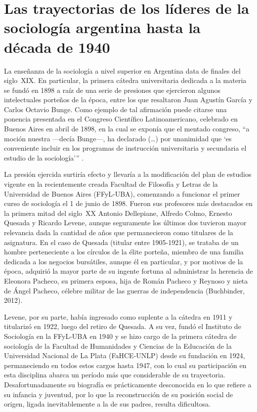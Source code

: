 \section{Las trayectorias de los líderes de la sociología argentina hasta la década de 1940}

La enseñanza de la sociología a nivel superior en Argentina data de finales del siglo~XIX. En particular, la primera cátedra universitaria dedicada a la materia se fundó en 1898 a raíz de una serie de presiones que ejercieron algunos intelectuales porteños de la época, entre los que resaltaron Juan Agustín García y Carlos Octavio Bunge. Como ejemplo de tal afirmación puede citarse una ponencia presentada en el Congreso Científico Latinoamericano, celebrado en Buenos Aires en abril de 1898, en la cual se exponía que el mentado congreso, \enquote{a moción nuestra ---decía Bunge---, ha declarado (\dots) por unanimidad que \enquote{es conveniente incluir en los programas de instrucción universitaria y secundaria el estudio de la sociología}} \parencite[80]{1445-BUNGE1898}.

La presión ejercida surtiría efecto y llevaría a la modificación del plan de estudios vigente en la recientemente creada Facultad de Filosofía y Letras de la Universidad de Buenos Aires (FFyL-UBA), comenzando a funcionar el primer curso de sociología el 1 de junio de 1898. Fueron sus profesores más destacados en la primera mitad del siglo~XX Antonio Dellepiane, Alfredo Colmo, Ernesto Quesada y Ricardo Levene, aunque seguramente los últimos dos tuvieron mayor relevancia dada la cantidad de años que permanecieron como titulares de la asignatura. En el caso de Quesada (titular entre 1905-1921), se trataba de un hombre perteneciente a los círculos de la élite porteña, miembro de una familia dedicada a los negocios bursátiles, aunque él en particular, y por motivos de la época, adquirió la mayor parte de su ingente fortuna al administrar la herencia de Eleonora Pacheco, su primera esposa, hija de Román Pacheco y Reynoso y nieta de Ángel Pacheco, célebre militar de las guerras de independencia (Buchbinder, 2012).

Levene, por su parte, había ingresado como suplente a la cátedra en 1911 y titularizó en 1922, luego del retiro de Quesada. A su vez, fundó el Instituto de Sociología en la FFyL-UBA en 1940 y se hizo cargo de la primera cátedra de sociología de la Facultad de Humanidades y Ciencias de la Educación de la Universidad Nacional de La Plata (FaHCE-UNLP) desde su fundación en 1924, permaneciendo en todos estos cargos hasta 1947, con lo cual su participación en esta disciplina abarca un período más que considerable de su trayectoria. Desafortunadamente su biografía es prácticamente desconocida en lo que refiere a su infancia y juventud, por lo que la reconstrucción de su posición social de origen, ligada inevitablemente a la de sus padres, resulta dificultosa.

